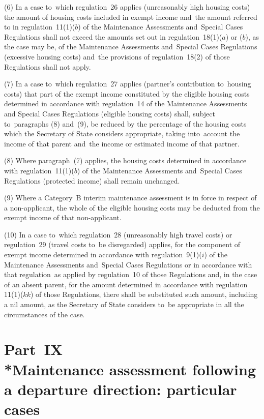 \documentclass[12pt,a4paper]{article}
\begin{document}
(6) In a case to~which regulation~26 applies (unreasonably high housing costs)
the amount of housing costs included in exempt income and~the amount referred to
in regulation~11(1)($b$) of the Maintenance Assessments and~Special Cases
Regulations shall not exceed the amounts set out in regulation~18(1)($a$) or ($b$),
as the case may be, of the Maintenance Assessments and~Special Cases Regulations
(excessive housing costs) and~the provisions of regulation~18(2) of those
Regulations shall not apply.

(7) In a case to~which regulation~27 applies (partner’s contribution to~housing
costs) that part of the exempt income constituted by the eligible housing costs
determined in accordance with regulation~14 of the Maintenance Assessments and
Special Cases Regulations (eligible housing costs) shall, subject to~paragraphs
(8) and~(9), be reduced by the percentage of the housing costs which the
Secretary of State considers appropriate, taking into~account the income of that
parent and~the income or estimated income of that partner.

(8) Where paragraph~(7) applies, the housing costs determined in accordance with
regulation~11(1)($b$) of the Maintenance Assessments and~Special Cases Regulations
(protected income) shall remain unchanged.

(9) Where a Category~B interim maintenance assessment is in force in respect of
a non-applicant, the whole of the eligible housing costs may be deducted from
the exempt income of that non-applicant.

(10) In a case to~which regulation~28 (unreasonably high travel costs) or
regulation~29 (travel costs to~be disregarded) applies, for the component of
exempt income determined in accordance with regulation~9(1)($i$) of the
Maintenance Assessments and~Special Cases Regulations or in accordance with that
regulation~as applied by regulation~10 of those Regulations and, in the case of
an absent parent, for the amount determined in accordance with regulation
11(1)($kk$) of those Regulations, there shall be substituted such amount,
including a nil amount, as the Secretary of State considers to~be appropriate in
all the circumstances of the case.


\section[Part~IX --- Maintenance assessment following a departure direction: particular cases]{\sloppy Part~IX\\*Maintenance assessment following a departure direction: particular cases}
\end{document}

